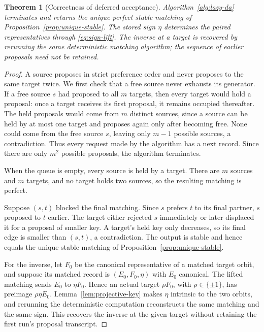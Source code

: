 \documentclass[11pt]{amsart}
\newtheorem{theorem}{Theorem}[section]
\theoremstyle{definition}
\theoremstyle{remark}
\begin{document}
\begin{theorem}[Correctness of deferred acceptance]\label{thm:DA-correct}
Algorithm~\ref{alg:lazy-da} terminates and returns the unique perfect stable
matching of Proposition~\ref{prop:unique-stable}.  The stored sign
$\eta$ determines the paired representatives through \eqref{eq:sign-lift}.
The inverse at a target is recovered by rerunning the same deterministic
matching algorithm; the sequence of earlier proposals need not be retained.
\end{theorem}

\begin{proof}
A source proposes in strict preference order and never proposes to the same
target twice.  We first check that a free source never exhausts its generator.
If a free source $s$ had proposed to all $m$ targets, then every target would
hold a proposal: once a target receives its first proposal, it remains
occupied thereafter.  The held proposals would come from $m$ distinct
sources, since a source can be held by at most one target and proposes again
only after becoming free.  None could come from the free source $s$, leaving
only $m-1$ possible sources, a contradiction.  Thus every request made by the
algorithm has a next record.  Since there are only $m^2$ possible proposals,
the algorithm terminates.

When the queue is empty, every source is held by a target.  There are $m$
sources and $m$ targets, and no target holds two sources, so the resulting
matching is perfect.

Suppose $(s,t)$ blocked the final matching.  Since $s$ prefers $t$ to its final
partner, $s$ proposed to $t$ earlier.  The target either rejected $s$
immediately or later displaced it for a proposal of smaller key.  A target's
held key only decreases, so its final edge is smaller than $(s,t)$, a
contradiction.  The output is stable and hence equals the unique stable
matching of Proposition~\ref{prop:unique-stable}.

For the inverse, let $F_0$ be the canonical representative of a matched target
orbit, and suppose its matched record is $(E_0,F_0,\eta)$ with $E_0$ canonical.
The lifted matching sends $E_0$ to $\eta F_0$.  Hence an actual target
$\rho F_0$, with $\rho\in\{\pm1\}$, has preimage $\rho\eta E_0$.
Lemma~\ref{lem:projective-key} makes $\eta$ intrinsic to the two orbits, and
rerunning the deterministic computation reconstructs the same matching and
the same sign.  This recovers the inverse at the given target without
retaining the first run's proposal transcript.
\end{proof}
\end{document}
